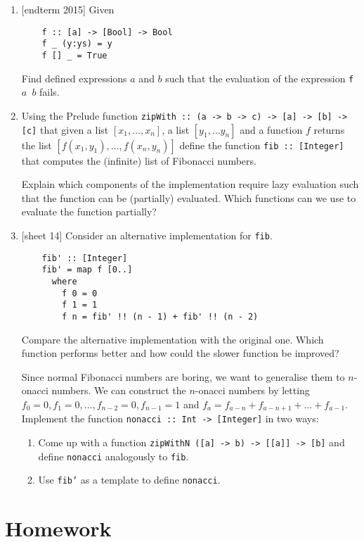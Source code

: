 \documentclass{article}
\def\code#1{\texttt{#1}}
\begin{document}
\begin{enumerate}
    \item {[endterm 2015]} Given
        \begin{verbatim}
    f :: [a] -> [Bool] -> Bool
    f _ (y:ys) = y
    f [] _ = True
        \end{verbatim}
        Find defined expressions $a$ and $b$ such that the evaluation of the expression \code{f $a$ $b$} fails.

    \item Using the Prelude function \code{zipWith :: (a -> b -> c) -> [a] -> [b] -> [c]} that given a list $[x_1, \dots, x_n]$, a list $[y_1, \dots y_n]$ and a function $f$ returns the list $[f(x_1, y_1), \dots, f(x_n, y_n)]$ define the function \code{fib :: [Integer]} that computes the (infinite) list of Fibonacci numbers. \par
    Explain which components of the implementation require lazy evaluation such that the function can be (partially) evaluated. Which functions can we use to evaluate the function partially?

    \item {[sheet 14]} Consider an alternative implementation for \code{fib}.
        \begin{verbatim}
    fib' :: [Integer]
    fib' = map f [0..]
      where
        f 0 = 0
        f 1 = 1
        f n = fib' !! (n - 1) + fib' !! (n - 2)
        \end{verbatim}
        Compare the alternative implementation with the original one. Which function performs better and how could the slower function be improved? \par
        Since normal Fibonacci numbers are boring, we want to generalise them to $n$-onacci numbers. We can construct the $n$-onacci numbers by letting $f_0 = 0, f_1 = 0, \dots, f_{n-2} = 0, f_{n-1} = 1$ and $f_a = f_{a-n} + f_{a-n+1} + \dots + f_{a-1}$. Implement the function \code{nonacci :: Int -> [Integer]} in two ways:
        \begin{enumerate}
            \item Come up with a function \code{zipWithN ([a] -> b) -> [[a]] -> [b]} and define \code{nonacci} analogously to \code{fib}.
            \item Use \code{fib'} as a template to define \code{nonacci}.
        \end{enumerate}
\end{enumerate}

\section{Homework}

\printbibliography
\end{document}
